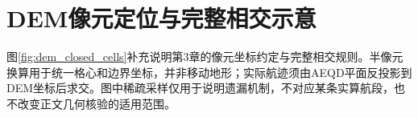 \clearpage
\section{DEM像元定位与完整相交示意}
\label{sec:dem_figure_notes}

图\ref{fig:dem_closed_cells}补充说明第3章的像元坐标约定与完整相交规则。半像元换算用于统一格心和边界坐标，并非移动地形；实际航迹须由AEQD平面反投影到DEM坐标后求交。图中稀疏采样仅用于说明遗漏机制，不对应某条实算航段，也不改变正文几何核验的适用范围。

\CommonDEMFigure
